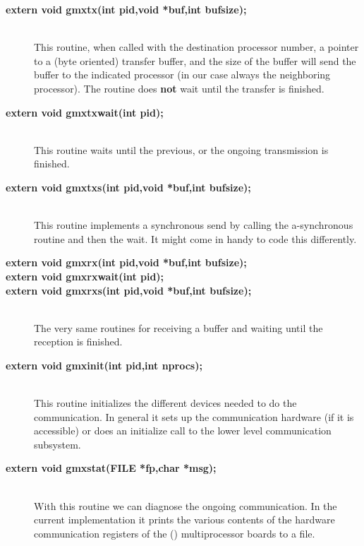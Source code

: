 \begin{description}
\item[{\bf extern void gmx\us{}tx(int pid,void *buf,int bufsize);}]\mbox{}\\ 
This routine, when called with the destination processor number, a
pointer to a (byte oriented) transfer buffer, and the size of the
buffer will send the buffer to the indicated processor (in our case
always the neighboring processor). The routine does {\bf not} wait
until the transfer is finished.

\item[{\bf extern void gmx\us{}tx\us{}wait(int pid);}]\mbox{}\\
This routine waits until the previous, or the ongoing transmission is
finished.

\item[{\bf extern void gmx\us{}txs(int pid,void *buf,int bufsize);}]\mbox{}\\
This routine implements a synchronous send by calling the
a-synchronous routine and then the wait. It might come in handy to
code this differently.

\item[{\bf extern void gmx\us{}rx(int pid,void *buf,int bufsize);}]
\item[{\bf extern void gmx\us{}rx\us{}wait(int pid);}]\vspace{-\itemsep}
\item[{\bf extern void gmx\us{}rxs(int pid,void *buf,int bufsize);}]\vspace{-\itemsep}\mbox{}\\
The very same routines for receiving a buffer and waiting until the
reception is finished.

\item[{\bf extern void gmx\us{}init(int pid,int nprocs);}]\mbox{}\\
This routine initializes the different devices needed to do the
communication. In general it sets up the communication hardware (if it
is accessible) or does an initialize call to the lower level
communication subsystem.

\item[{\bf extern void gmx\us{}stat(FILE *fp,char *msg);}]\mbox{}\\
With this routine we can diagnose the ongoing communication. In the
current implementation it prints the various contents of the hardware
communication registers of the (\intel) multiprocessor boards to a
file.
\end{description}

